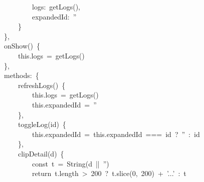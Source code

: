\documentclass[a4paper,10pt]{article}
\begin{document}
{~~~~~~~~~~~~~~~~logs:~getLogs(),\\
~~~~~~~~~~~~~~~~expandedId:~''\\
~~~~~~~~~~~~\}\\
~~~~~~~~\},\\
~~~~~~~~onShow()~\{\\
~~~~~~~~~~~~this.logs~=~getLogs()\\
~~~~~~~~\},\\
~~~~~~~~methods:~\{\\
~~~~~~~~~~~~refreshLogs()~\{\\
~~~~~~~~~~~~~~~~this.logs~=~getLogs()\\
~~~~~~~~~~~~~~~~this.expandedId~=~''\\
~~~~~~~~~~~~\},\\
~~~~~~~~~~~~toggleLog(id)~\{\\
~~~~~~~~~~~~~~~~this.expandedId~=~this.expandedId~===~id~?~''~:~id\\
~~~~~~~~~~~~\},\\
~~~~~~~~~~~~clipDetail(d)~\{\\
~~~~~~~~~~~~~~~~const~t~=~String(d~||~'')\\
~~~~~~~~~~~~~~~~return~t.length~>~200~?~t.slice(0,~200)~+~'...'~:~t
}

\newpage
\end{document}
